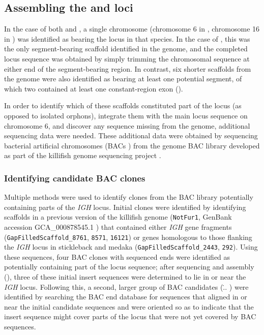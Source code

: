 \subsection{Assembling the \Nfu and \Xma \igh{} loci}
\label{sec:locus_assembly_methods}

In the case of both \nfu and \xma, a single chromosome (chromosome 6 in \Nfu, chromosome 16 in \Xma) was identified as bearing the \igh{} locus in that species. In the case of \Xma, this was the only segment-bearing scaffold identified in the genome, and the completed locus sequence was obtained by simply trimming the chromosomal sequence at either end of the segment-bearing region. In contrast, six shorter scaffolds from the \Nfu genome were also identified as bearing at least one potential \igh segment, of which two contained at least one constant-region exon (). 

In order to identify which of these scaffolds constituted part of the \Nfu \igh{} locus (as opposed to isolated orphons), integrate them with the main locus sequence on chromosome 6, and discover any sequence missing from the genome, additional sequencing data were needed. These additional data were obtained by sequencing bacterial artificial chromosomes (BACs \parencite{luo2001bac,saski2015bacprotocol}) from the \Nfu genome BAC library developed as part of the killifish genome sequencing project \parencite{reichwald2015genome}.

\subsubsection{Identifying candidate BAC clones}
\label{sec:bac-methods-ident}

Multiple methods were used to identify clones from the BAC library potentially containing parts of the \textit{IGH} locus. Initial clones were identified by identifying scaffolds in a previous version of the killifish genome (\texttt{NotFur1}, GenBank accession GCA\_000878545.1 \parencite{valenzano2015genome}) that contained either \textit{IGH} gene fragments (\texttt{GapFilledScaffold\_8761}, \texttt{8571}, \texttt{16121}) or genes homologous to those flanking the \textit{IGH} locus in stickleback and medaka (\texttt{GapFilledScaffold\_2443}, \texttt{292}). Using these sequences, four BAC clones with sequenced ends \parencite{reichwald2015genome} were identified as potentially containing part of the locus sequence; after sequencing and assembly (), three of these initial insert sequences were determined to lie in or near the \textit{IGH} locus. Following this, a second, larger group of BAC candidates (\... %
) were identified by searching the BAC end database for sequences that aligned in or near the initial candidate sequences and were oriented so as to indicate that the insert sequence might cover parts of the locus that were not yet covered by BAC sequences.

